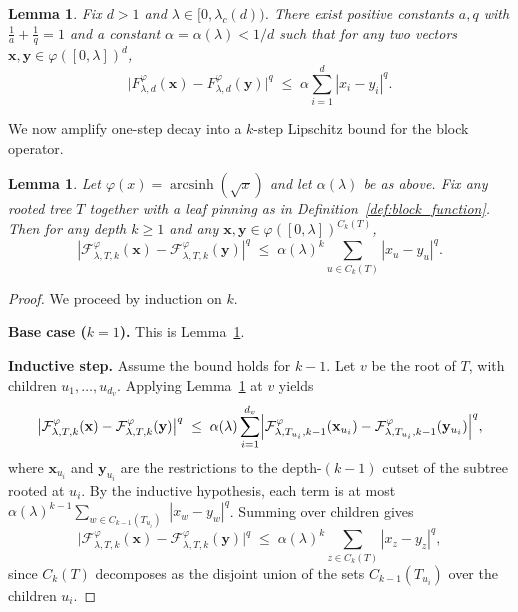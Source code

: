 \documentclass[a4paper,11pt]{article}
\DeclareMathOperator{\arcsinh}{arcsinh}
\theoremstyle{plain}
\newtheorem{lemma}[theorem]{Lemma}
\theoremstyle{definition}
\theoremstyle{remark}
\newcommand{\1}{\mathbf{1}}
\begin{document}
\begin{lemma}
\label{lem:one_step_decay}
Fix $d>1$ and $\lambda \in [0,\lambda_c(d))$.
There exist positive constants $a,q$ with $\frac{1}{a}+\frac{1}{q}=1$ and
a constant $\alpha=\alpha(\lambda)<1/d$ such that for any two vectors
$\mathbf{x},\mathbf{y}\in \varphi([0,\lambda])^{d}$,
\[
    \bigl|F_{\lambda,d}^{\varphi}(\mathbf{x}) - F_{\lambda,d}^{\varphi}(\mathbf{y})\bigr|^{q}
    \;\le\;
    \alpha \sum_{i=1}^{d} |x_i-y_i|^{q}.
\]
\end{lemma}


We now amplify one-step decay into a $k$-step Lipschitz bound for the block operator.

\begin{lemma}
\label{lem:block_lipschitz}
Let $\varphi(x) = \arcsinh (\sqrt{x})$ and let $\alpha(\lambda)$ be as above.
Fix any rooted tree $T$ together with a leaf pinning as in Definition~\ref{def:block_function}. Then for any depth
$k \ge 1$ and any $\mathbf{x},\mathbf{y}\in \varphi([0,\lambda])^{C_k(T)}$,
\begin{equation}
|\mathcal{F}^{\varphi}_{\lambda, T,k}(\mathbf{x}) - \mathcal{F}^{\varphi}_{\lambda, T,k}(\mathbf{y})|^q
\;\le\;
\alpha(\lambda)^k \sum_{u \in C_k(T)} |x_u - y_u|^q.
\end{equation}
\end{lemma}

\begin{proof}
We proceed by induction on $k$.

\noindent\textbf{Base case ($k=1$).}
This is Lemma~\ref{lem:one_step_decay}.

\noindent\textbf{Inductive step.}
Assume the bound holds for $k-1$. Let $v$ be the root of $T$, with children $u_1,\dots,u_{d_v}$.
Applying Lemma~\ref{lem:one_step_decay} at $v$ yields
\[
\bigl|\mathcal{F}^{\varphi}_{\lambda, T,k}(\mathbf{x}) - \mathcal{F}^{\varphi}_{\lambda, T,k}(\mathbf{y})\bigr|^q
\;\le\;
\alpha(\lambda)\sum_{i=1}^{d_v}\Bigl|
\mathcal{F}^{\varphi}_{\lambda, T_{u_i},k-1}(\mathbf{x}_{u_i}) -
\mathcal{F}^{\varphi}_{\lambda, T_{u_i},k-1}(\mathbf{y}_{u_i})
\Bigr|^q,
\]
where $\mathbf{x}_{u_i}$ and $\mathbf{y}_{u_i}$ are the restrictions to the depth-$(k-1)$ cutset of the subtree rooted at $u_i$.
By the inductive hypothesis, each term is at most
$\alpha(\lambda)^{k-1}\sum_{w\in C_{k-1}(T_{u_i})}$ $|x_w-y_w|^q$.
Summing over children gives
\[
\bigl|\mathcal{F}^{\varphi}_{\lambda, T,k}(\mathbf{x}) - \mathcal{F}^{\varphi}_{\lambda, T,k}(\mathbf{y})\bigr|^q
\;\le\;
\alpha(\lambda)^k \sum_{z\in C_k(T)} |x_z-y_z|^q,
\]
since $C_k(T)$ decomposes as the disjoint union of the sets $C_{k-1}(T_{u_i})$ over the children $u_i$.
\end{proof}
\end{document}
